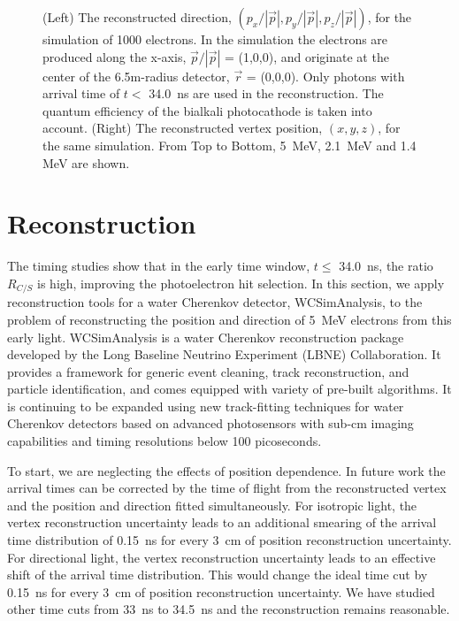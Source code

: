 \documentclass[cits]{JINST}
\begin{document}
\begin{figure}[tbh]
\begin{center}
        \caption[]{\label{fig:reco} (Left) The reconstructed direction,
        $(p_x/|\vec{p}|, p_y/|\vec{p}|,
        p_z/|\vec{p}|)$, for the simulation of 1000 electrons. In the simulation the electrons are produced along the
        x-axis, $\vec{p}/|\vec{p}|$ = (1,0,0), and originate
        at the center of the 6.5m-radius detector, $\vec{r}$ =
        (0,0,0). Only photons with arrival time of $t<$ 34.0~ns are used
        in the reconstruction. The quantum efficiency of the bialkali
        photocathode is taken into account. (Right) The reconstructed
        vertex position, $(x,y,z)$, for the same simulation. From Top to Bottom, 5~MeV, 2.1~MeV and 1.4 MeV are shown.}
\end{center}
\end{figure}

\section{Reconstruction}
\label{reconstruction_sec}

The timing studies show that in the early time window, $t\leq$
34.0~ns, the ratio $R_{C/S}$ is high, improving the photoelectron hit selection. In this section, we apply
reconstruction tools for a water Cherenkov detector, WCSimAnalysis,
to the problem of reconstructing the position and direction of 5~MeV
electrons from this early light. WCSimAnalysis is a water Cherenkov
reconstruction package developed by the Long Baseline Neutrino
Experiment (LBNE) Collaboration\cite{Blake}. It provides a framework
for generic event cleaning, track reconstruction, and particle
identification, and comes equipped with variety of pre-built
algorithms. It is continuing to be expanded using new track-fitting
techniques for water Cherenkov detectors\cite{Sanchez2012525} based on
advanced photosensors with sub-cm imaging capabilities and timing
resolutions below 100 picoseconds.

To start, we are neglecting the effects of position dependence. In future work the arrival times can be corrected by the time of flight from the reconstructed vertex and the position and direction fitted simultaneously. For isotropic light, the vertex reconstruction uncertainty leads to an additional smearing of the arrival time distribution of 0.15~ns for every 3~cm of position reconstruction uncertainty. For directional light, the vertex reconstruction uncertainty leads to an effective shift of the arrival time distribution. This would change the ideal time cut by 0.15~ns  for every 3~cm of position reconstruction uncertainty. We have studied other time cuts from 33~ns to 34.5~ns and the reconstruction remains reasonable. 
\end{document}
